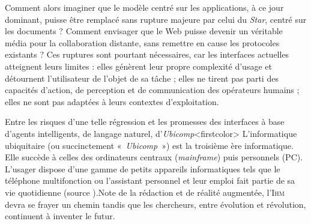 Comment alors imaginer que le modèle centré sur les applications, à ce jour dominant, puisse être remplacé sans rupture majeure par celui du \textit{Star}, centré sur les documents ? Comment envisager que le Web puisse devenir un véritable média pour la collaboration distante, sans remettre en cause les protocoles existants ?
Ces ruptures sont pourtant nécessaires, car les interfaces actuelles atteignent leurs limites : elles génèrent leur propre complexité d'usage et détournent l'utilisateur de l'objet de sa tâche ; elles ne tirent pas parti des capacités d'action, de perception et de communication des opérateurs humains ; elles ne sont pas adaptées à leurs contextes d'exploitation.

Entre les risques d’une telle régression et les promesses des interfaces à base d'agents intelligents, de langage naturel, d'\textit{Ubicomp}\caution[b]<firstcolor>{%
L'informatique ubiquitaire (ou succinctement «~\textit{Ubicomp}~») est la troisième ère informatique. Elle succè\-de à celles des ordinateurs centraux (\textit{mainframe}) puis personnels (PC). L'usager dispose d'une gamme de petits appareils informatiques tels que le téléphone multifonction ou l'assistant personnel et leur emploi fait partie de sa vie quotidienne (source \href{https://fr.wikipedia.org/wiki/Informatique_ubiquitaire}{\faWikipediaW}).}{Note de la rédaction}
et de réalité augmentée, l'\textsc{Ihm} devra se frayer un chemin tandis que les chercheurs, entre évolution et révolution, continuent à inventer le futur.


\noindent{}

\noindent{}

\noindent{}%

\noindent{}

\noindent{}

\noindent{}%

\noindent{}

